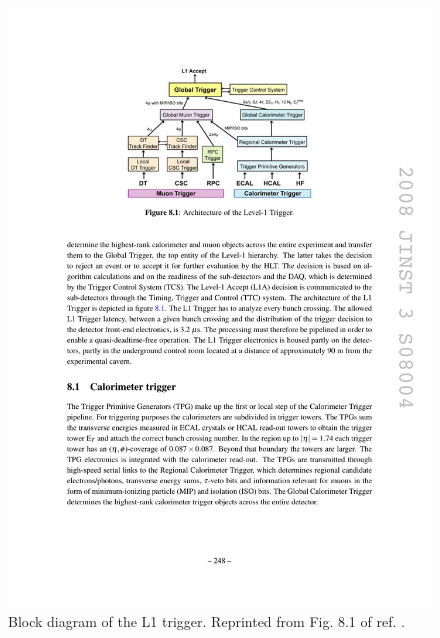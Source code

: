 \documentclass[dissertation.tex]{subfiles}
\begin{document}
\begin{figure}
	\centering
	\includegraphics[scale=1.0]{L1_trigger_diagram}
	\caption{Block diagram of the L1 trigger.  Reprinted from Fig. 8.1 of ref. \cite{1748-0221-3-08-S08004}.}
	\label{fig:L1_trigger_diagram}
\end{figure}
\end{document}
